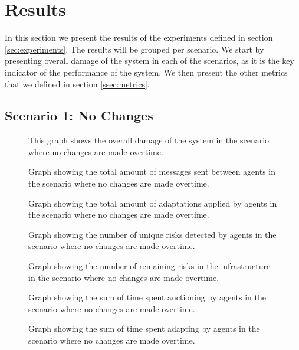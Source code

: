 \section{Results}
\label{sec:results}
In this section we present the results of the experiments defined in section \ref{sec:experiments}. The results will be grouped per scenario. We start by presenting overall damage of the system in each of the scenarios, as it is the key indicator of the performance of the system. We then present the other metrics that we defined in section \ref{ssec:metrics}.

\subsection{Scenario 1: No Changes}

\begin{figure}[H]
    \centering
    
    \caption{This graph shows the overall damage of the system in the scenario where no changes are made overtime.}
    \label{fig:overall-damage-no-change}
\end{figure}
\begin{figure}[H]
    \centering
    
    \caption{Graph showing the total amount of messages sent between agents in the scenario where no changes are made overtime.}
\end{figure}
\begin{figure}[H]
    \centering
    
    \caption{Graph showing the total amount of adaptations applied by agents in the scenario where no changes are made overtime.}
\end{figure}
\begin{figure}[H]
    \centering
        
    \caption{Graph showing the number of unique risks detected by agents in the scenario where no changes are made overtime.}
\end{figure}
\begin{figure}[H]
    \centering
        
    \caption{Graph showing the number of remaining risks in the infrastructure in the scenario where no changes are made overtime.}
\end{figure}
\begin{figure}[H]
    \centering
        
    \caption{Graph showing the sum of time spent auctioning by agents in the scenario where no changes are made overtime.}
\end{figure}
\begin{figure}[H]
    \centering
        
    \caption{Graph showing the sum of time spent adapting by agents in the scenario where no changes are made overtime.}
\end{figure}


